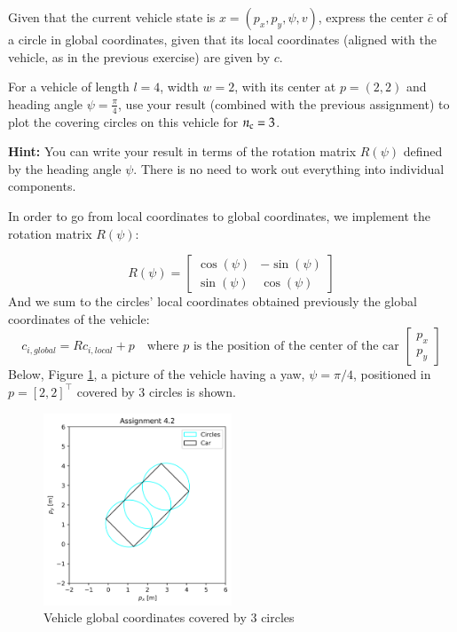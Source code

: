 \documentclass[]{article}
\begin{document}
\begin{assignment}
	Given that the current vehicle state is $x = (p_x, p_y, \psi, v)$, 
	express the center $\bar{c}$ of a circle in global coordinates, given that its local coordinates 
	(aligned with the vehicle, as in the previous exercise) are given by $c$.

	For a vehicle of length $l = 4$, width $w = 2$, with its center at $p = (2,2)$
	and heading angle $\psi = \tfrac{\pi}{4}$, use your result (combined with the previous assignment) to plot the 
	covering circles on this vehicle for $n_{\mathrm{c}} = 3$.

	\textbf{Hint:} You can write your result in terms of the rotation matrix $R(\psi)$ defined by 
	the heading angle $\psi$. There is no need to work out everything into individual components.
\end{assignment}
\begin{flushleft}
	In order to go from local coordinates to global coordinates, we implement the rotation matrix $R(\psi)$:
\end{flushleft}
\[
	R(\psi) = \begin{bmatrix}
		\cos(\psi) & -\sin(\psi) \\
		\sin(\psi) & \cos(\psi)
	\end{bmatrix}
\]
And we sum to the circles' local coordinates obtained previously the global coordinates of the vehicle:
\[
	c_{i,global} = R c_{i,local} + p \quad \text{where } p \text{ is the position of the center of the car } 
	\begin{bmatrix}
		p_x \\ p_y
	\end{bmatrix}
\]
Below, Figure \ref{fig:assignment4_2}, a picture of the vehicle having a yaw, $ \psi = \pi/4 $, positioned in $	p = [2, 2]^\top $ covered by 3 circles is shown.
\begin{figure}[H]
    \centering
    \includegraphics[width=0.5\textwidth]{images/Assignment_42.png}
    \caption{Vehicle global coordinates covered by 3 circles}
    \label{fig:assignment4_2}
\end{figure}
\end{document}
